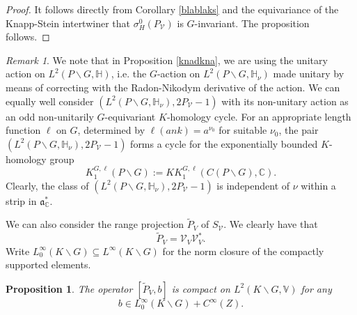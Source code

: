 \documentclass[a4paper,reqno]{amsart}
\numberwithin{equation}{section}
\def\C{\mathbb{C}}
\newtheorem{prop}[thm]{Proposition}
\theoremstyle{definition}
\theoremstyle{remark}
\newtheorem{remark}[thm]{Remark}
\begin{document}
\begin{proof}
It follows directly from Corollary \ref{blablaks} and the equivariance of the Knapp-Stein intertwiner that $\sigma^0_H(P_{\mathcal{V}})$ is $G$-invariant. The proposition follows.
\end{proof}

\begin{remark}
\label{laknlakndexp}
We note that in Proposition \ref{knadkna}, we are using the unitary action on $L^2(P\backslash G,\mathbb{H})$, i.e. the $G$-action on $L^2(P\backslash G,\mathbb{H}_\nu)$ made unitary by means of correcting with the Radon-Nikodym derivative of the action. We can equally well consider  $(L^2(P\backslash G,\mathbb{H}_\nu),2P_{\mathcal{V}}-1)$ with its non-unitary action as an odd non-unitarily $G$-equivariant $K$-homology cycle. For an appropriate length function $\ell$ on $G$, determined by $\ell (ank)=a^{\nu_0}$ for suitable $\nu_0$, the pair $(L^2(P\backslash G,\mathbb{H}_\nu),2P_{\mathcal{V}}-1)$ forms a cycle for the exponentially bounded $K$-homology group \cite{goffbgg}
$$K_1^{G,\ell}(P\backslash G):=KK_1^{G,\ell}(C(P\backslash G),\C).$$ 
Clearly, the class of $(L^2(P\backslash G,\mathbb{H}_\nu),2P_{\mathcal{V}}-1)$ is independent of $\nu$ within a strip in $\mathfrak{a}_\C^*$.
\end{remark}


We can also consider the range projection $\tilde{P}_V$ of $S_{\mathcal{V}}$. We clearly have that 
$$\tilde{P}_V=\mathcal{V}_V\mathcal{V}_V^*.$$
Write $L^\infty_0(K\backslash G)\subseteq L^\infty(K\backslash G)$ for the norm closure of the compactly supported elements. 

\begin{prop}
\label{lknlmndirac}
The operator $[\tilde{P}_V,b]$ is compact on $L^2(K\backslash G,\mathbb{V})$ for any 
$$b\in L^\infty_0(K\backslash G)+C^\infty(Z).$$ 
\end{prop}
\end{document}
